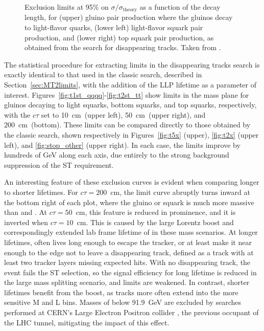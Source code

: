 \begin{figure}[htbp]
    \caption[Exclusion limits at 95\% \CL on gluino, light squark, and top squark pair production cross sections as a function of \chargino proper decay length, in the disappearing tracks search.]
      {Exclusion limits at 95\% \CL on $\sigma/\sigma_{\mathrm{theory}}$ as a function of the \chargino decay length, for
      (upper) gluino pair production where the gluinos decay to light-flavor quarks, (lower left) light-flavor squark pair production,
      and (lower right) top squark pair production, as obtained from the search for disappearing tracks. Taken from \cite{MT2_2019}.}
    \label{fig:limits2fixedmasses}
  \end{figure}
  
  The statistical procedure for extracting limits in the disappearing tracks search is exactly identical to that used in the classic search, described in Section~\ref{sec:MT2limits}, with the addition of the LLP lifetime as a parameter of interest.
  Figures~\ref{fig:t1st_qqqq}-\ref{fig:t2st_tt} show limits in the mass plane for gluinos decaying to light squarks, bottom squarks, and top squarks, respectively, with the \chargino $c\tau$ set to 10~cm~(upper left), 50~cm~(upper right), and 200~cm~(bottom).
  These limits can be compared directly to those obtained by the classic search, shown respectively in Figures~\ref{fig:t5x} (upper), \ref{fig:t2x} (upper left), and \ref{fig:stop_other} (upper right).
  In each case, the limits improve by hundreds of GeV along each axis, due entirely to the strong background suppression of the ST requirement.
  
  An interesting feature of these exclusion curves is evident when comparing longer to shorter \chargino lifetimes.
  For $c\tau = 200$~cm, the limit curve abruptly turns inward at the bottom right of each plot, where the gluino or squark is much more massive than \chargino and \lsp.
  At $c\tau = 50$~cm, this feature is reduced in prominence, and it is inverted when $c\tau = 10$~cm.
  This is caused by the large Lorentz boost and correspondingly extended lab frame lifetime of \chargino in these mass scenarios.
  At longer lifetimes, \chargino often lives long enough to escape the tracker, or at least make it near enough to the edge not to leave a disappearing track, defined as a track with at least two tracker layers missing expected hits.
  With no disappearing track, the event fails the ST selection, so the signal efficiency for long \chargino lifetime is reduced in the large mass splitting scenario, and limits are weakened.
  In contrast, shorter lifetimes benefit from the boost, as tracks more often extend into the more sensitive M and L bins.
  Masses of \chargino below 91.9~GeV are excluded by searches performed at CERN's Large Electron Positron collider \cite{lep_chargino}, the previous occupant of the LHC tunnel, mitigating the impact of this effect.

